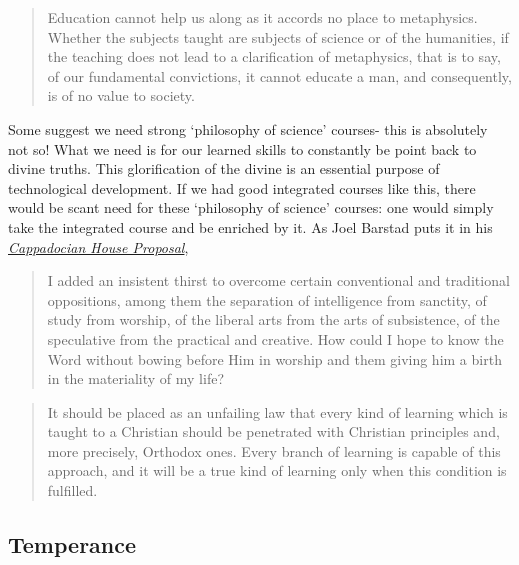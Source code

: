 \documentclass[letterpaper]{article}
\begin{document}
\begin{quote}
  Education cannot help us along as it accords no place to metaphysics. Whether the subjects taught are subjects of science or of the humanities, if the teaching does not lead to a clarification of metaphysics, that is to say, of our fundamental convictions, it cannot educate a man, and consequently, is of no value to society.
\end{quote}

Some suggest we need strong `philosophy of science' courses- this is absolutely not so! What we need is for our learned skills to constantly be point back to divine truths. This glorification of the divine is an essential purpose of technological development. If we had good integrated courses like this, there would be scant need for these `philosophy of science' courses: one would simply take the integrated course and be enriched by it. As Joel Barstad puts it in his \href{https://byzantinela.com/cappadocian-house-proposal/}{\textit{Cappadocian House Proposal}},

\begin{quote}
  I added an insistent thirst to overcome certain conventional and traditional oppositions, among them the separation of intelligence from sanctity, of study from worship, of the liberal arts from the arts of subsistence, of the speculative from the practical and creative. How could I hope to know the Word without bowing before Him in worship and them giving him a birth in the materiality of my life?
\end{quote}

\begin{quote}
  It should be placed as an unfailing law that every kind of learning which is taught to a Christian should be penetrated with Christian principles and, more precisely, Orthodox ones. Every branch of learning is capable of this approach, and it will be a true kind of learning only when this condition is fulfilled.
\end{quote}


\subsection{Temperance}
\end{document}
